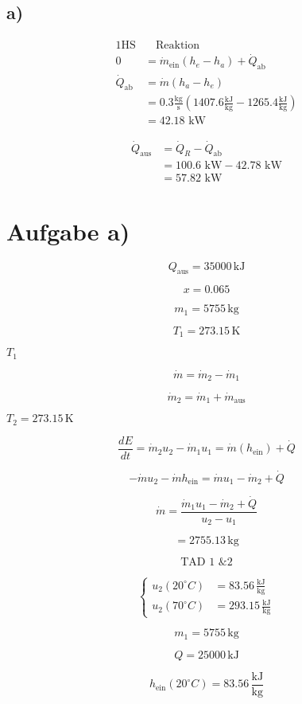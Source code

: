 

\subsection*{a)}

\begin{align*}
\text{1HS} & \quad \text{Reaktion} \\
0 &= \dot{m}_{\text{ein}} (h_e - h_a) + \dot{Q}_{\text{ab}} \\
\dot{Q}_{\text{ab}} &= \dot{m} (h_a - h_e) \\
&= 0.3 \frac{\text{kg}}{\text{s}} (1407.6 \frac{\text{kJ}}{\text{kg}} - 1265.4 \frac{\text{kJ}}{\text{kg}}) \\
&= 42.18 \text{ kW}
\end{align*}

\begin{align*}
\dot{Q}_{\text{aus}} &= \dot{Q}_R - \dot{Q}_{\text{ab}} \\
&= 100.6 \text{ kW} - 42.78 \text{ kW} \\
&= 57.82 \text{ kW}
\end{align*}

\section*{Aufgabe a)}

\[
Q_{\text{aus}} = 35000 \, \text{kJ}
\]

\[
x = 0.065
\]

\[
m_1 = 5755 \, \text{kg}
\]

\[
T_1 = 273.15 \, \text{K}
\]

 \( T_1 \)

\[
\dot{m} = \dot{m}_2 - \dot{m}_1
\]

\[
\dot{m}_2 = \dot{m}_1 + \dot{m}_\text{aus}
\]

 \( T_2 = 273.15 \, \text{K} \)

\[
\frac{dE}{dt} = \dot{m}_2 u_2 - \dot{m}_1 u_1 = \dot{m} (h_\text{ein}) + \dot{Q}
\]

\[
-\dot{m} u_2 - \dot{m} h_\text{ein} = \dot{m} u_1 - \dot{m}_2 + \dot{Q}
\]

\[
\dot{m} = \frac{\dot{m}_1 u_1 - \dot{m}_2 + \dot{Q}}{u_2 - u_1}
\]

\[
= 2755.13 \, \text{kg}
\]


\[
\text{TAD 1 \& 2}
\]

\[
\left\{
\begin{aligned}
u_2 (20^\circ C) &= 83.56 \, \frac{\text{kJ}}{\text{kg}} \\
u_2 (70^\circ C) &= 293.15 \, \frac{\text{kJ}}{\text{kg}}
\end{aligned}
\right.
\]

\[
m_1 = 5755 \, \text{kg}
\]

\[
Q = 25000 \, \text{kJ}
\]

\[
h_\text{ein} (20^\circ C) = 83.56 \, \frac{\text{kJ}}{\text{kg}}
\]